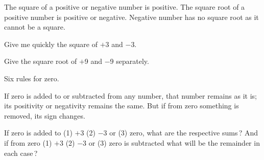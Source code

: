 \documentclass[]{article}
\begin{document}
{The square of a positive or negative number is positive. The square
root of a positive number is positive or negative. Negative number has
no square root as it cannot be a square.

\begin{quote}  {
}  \end{quote}

Give me quickly the square of $+$3 and $-$3.

\begin{quote}  {
}  \end{quote}

Give the square root of $+$9 and $-$9 separately.

\vspace{20pt}
\begin{center}
\begin{Large}
 \label{shu}
{}
\end{Large}
\end{center}
\vspace{10pt}
{Six rules for zero.

\begin{quote}  {
}  \end{quote}

If zero is added to or subtracted from any number, that number remains
as it is; its positivity or negativity remains the same. But if from
zero something is removed, its sign changes. 

\begin{quote}  {
}  \end{quote}

If zero is added to (1) $+$3 (2) $-$3 or (3) zero, what are the respective
sums\,? And if from zero (1) $+$3 (2) $-$3 or (3) zero is subtracted what will
be the remainder in each case\,?

\begin{quote}  {
}  \end{quote}

}}
\end{document}
